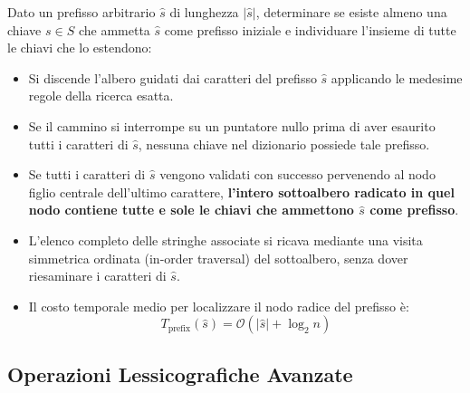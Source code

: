 Dato un prefisso arbitrario $\hat{s}$ di lunghezza $|\hat{s}|$, determinare se esiste almeno una chiave $s \in S$ che ammetta $\hat{s}$ come prefisso iniziale e individuare l'insieme di tutte le chiavi che lo estendono:
\begin{itemize}
  \item Si discende l'albero guidati dai caratteri del prefisso $\hat{s}$ applicando le medesime regole della ricerca esatta.
  \item Se il cammino si interrompe su un puntatore nullo prima di aver esaurito tutti i caratteri di $\hat{s}$, nessuna chiave nel dizionario possiede tale prefisso.
  \item Se tutti i caratteri di $\hat{s}$ vengono validati con successo pervenendo al nodo figlio centrale dell'ultimo carattere, \textbf{l'intero sottoalbero radicato in quel nodo contiene tutte e sole le chiavi che ammettono $\hat{s}$ come prefisso}.
  \item L'elenco completo delle stringhe associate si ricava mediante una visita simmetrica ordinata (in-order traversal) del sottoalbero, senza dover riesaminare i caratteri di $\hat{s}$.
  \item Il costo temporale medio per localizzare il nodo radice del prefisso \`e:
  \begin{equation}
    T_{\text{prefix}}(\hat{s}) = \mathcal{O}(|\hat{s}| + \log_2 n)
  \end{equation}
\end{itemize}

\FloatBarrier
\subsection{Operazioni Lessicografiche Avanzate}
\label{subsec:operazioni-lessicografiche}


